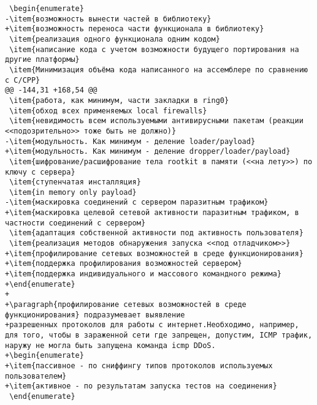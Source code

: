\begin{verbatim}
 \begin{enumerate}
-\item{возможность вынести частей в библиотеку}
+\item{возможность переноса части функционала в библиотеку}
 \item{реализация одного функционала одним кодом}
 \item{написание кода с учетом возможности будущего портирования на другие платформы}
 \item{Минимизация объёма кода написанного на ассемблере по сравнению с C/CPP}
@@ -144,31 +168,54 @@
 \item{работа, как минимум, части закладки в ring0}
 \item{обход всех применяемых local firewalls}
 \item{невидимость всем используемыми антивирусными пакетам (реакции <<подозрительно>> тоже быть не должно)}
-\item{модульность. Как минимум - деление loader/payload}
+\item{модульность. Как минимум - деление dropper/loader/payload}
 \item{шифрование/расшифрование тела rootkit в памяти (<<на лету>>) по ключу с сервера}
 \item{ступенчатая инсталляция}
 \item{in memory only payload}
-\item{маскировка соединений с сервером паразитным трафиком}
+\item{маскировка целевой сетевой активности паразитным трафиком, в частности соединений с сервером}
 \item{адаптация собственной активности под активность пользователя}
 \item{реализация методов обнаружения запуска <<под отладчиком>>}
+\item{профилирование сетевых возможностей в среде функционирования}
+\item{поддержка профилирования возможностей сервером}
+\item{поддержка индивидуального и массового командного режима}
+\end{enumerate}
+
+\paragraph{профилирование сетевых возможностей в среде функционирования} подразумевает выявление
+разрешенных протоколов для работы с интернет.Необходимо, например, для того, чтобы в зараженной сети где запрещен, допустим, ICMP трафик, наружу не могла быть запущена команда icmp DDoS.
+\begin{enumerate}
+\item{пассивное - по сниффингу типов протоколов используемых пользователем}
+\item{активное - по результатам запуска тестов на соединения}
 \end{enumerate}


\end{verbatim}
